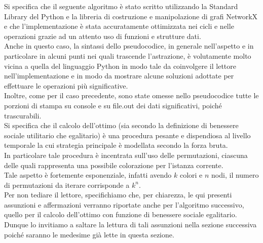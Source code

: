 Si specifica che il seguente algoritmo è stato scritto utilizzando la Standard Library del Python e la libreria di costruzione e manipolazione di grafi NetworkX e che l'implementazione è stata accuratamente ottimizzata nei cicli e nelle operazioni grazie ad un attento uso di funzioni e strutture dati.\\

Anche in questo caso, la sintassi dello pseudocodice, in generale nell'aspetto e in particolare in alcuni punti nei quali trascende l'astrazione, è volutamente molto vicina a quella del linguaggio Python in modo tale da coinvolgere il lettore nell'implementazione e in modo da mostrare alcune soluzioni adottate per effettuare le operazioni più significative.\\

Inoltre, come per il caso precedente, sono state omesse nello pseudocodice tutte le porzioni di stampa su console e su file.out dei dati significativi, poiché trascurabili.\\

Si specifica che il calcolo dell'ottimo (sia secondo la definizione di benessere sociale utilitario che egalitario) è una procedura pesante e dispendiosa al livello temporale la cui strategia principale è modellata secondo la forza bruta.\\
In particolare tale procedura è incentrata sull'uso delle permutazioni, ciascuna delle quali rappresenta una possibile colorazione per l'istanza corrente.\\
Tale aspetto è fortemente esponenziale, infatti avendo \(k\) colori e \(n\) nodi, il numero di permutazioni da iterare corrisponde a \(k^n\).\\

Per non tediare il lettore, specifichiamo che, per chiarezza, le qui presenti assunzioni e affermazioni verranno riportate anche per l'algoritmo successivo, quello per il calcolo dell'ottimo con funzione di benessere sociale egalitario.\\
Dunque lo invitiamo a saltare la lettura di tali assunzioni nella sezione successiva poiché saranno le medesime già lette in questa sezione.\\

